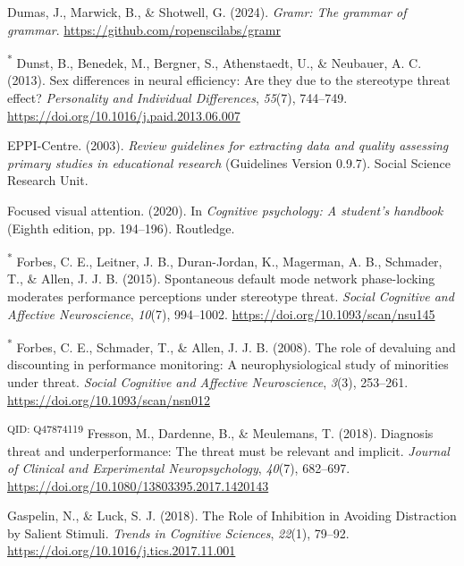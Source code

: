 \documentclass[
  stu, a4paper,floatsintext]{apa7}
\newlength{\cslhangindent}
\newenvironment{CSLReferences}[2] %
 {\begin{list}{}{%
  \setlength{\itemindent}{0pt}
  \setlength{\leftmargin}{0pt}
  \setlength{\parsep}{0pt}
  \ifodd #1
   \setlength{\leftmargin}{\cslhangindent}
   \setlength{\itemindent}{-1\cslhangindent}
  \fi
  \setlength{\itemsep}{#2\baselineskip}}}
 {\end{list}}
\begin{document}
\begin{CSLReferences}{1}{0}
Dumas, J., Marwick, B., \& Shotwell, G. (2024). \emph{Gramr: The grammar of grammar}. \url{https://github.com/ropenscilabs/gramr}

\textsuperscript{*} Dunst, B., Benedek, M., Bergner, S., Athenstaedt, U., \& Neubauer, A. C. (2013). Sex differences in neural efficiency: {Are} they due to the stereotype threat effect? \emph{Personality and Individual Differences}, \emph{55}(7), 744--749. \url{https://doi.org/10.1016/j.paid.2013.06.007}

EPPI-Centre. (2003). \emph{Review guidelines for extracting data and quality assessing primary studies in educational research} (Guidelines Version 0.9.7). Social Science Research Unit.

Focused visual attention. (2020). In \emph{Cognitive psychology: A student's handbook} (Eighth edition, pp. 194--196). Routledge.

\textsuperscript{*} Forbes, C. E., Leitner, J. B., Duran-Jordan, K., Magerman, A. B., Schmader, T., \& Allen, J. J. B. (2015). Spontaneous default mode network phase-locking moderates performance perceptions under stereotype threat. \emph{Social Cognitive and Affective Neuroscience}, \emph{10}(7), 994--1002. \url{https://doi.org/10.1093/scan/nsu145}

\textsuperscript{*} Forbes, C. E., Schmader, T., \& Allen, J. J. B. (2008). The role of devaluing and discounting in performance monitoring: A neurophysiological study of minorities under threat. \emph{Social Cognitive and Affective Neuroscience}, \emph{3}(3), 253--261. \url{https://doi.org/10.1093/scan/nsn012}

\textsuperscript{QID: Q47874119} Fresson, M., Dardenne, B., \& Meulemans, T. (2018). Diagnosis threat and underperformance: {The} threat must be relevant and implicit. \emph{Journal of Clinical and Experimental Neuropsychology}, \emph{40}(7), 682--697. \url{https://doi.org/10.1080/13803395.2017.1420143}

Gaspelin, N., \& Luck, S. J. (2018). The {Role} of {Inhibition} in {Avoiding Distraction} by {Salient Stimuli}. \emph{Trends in Cognitive Sciences}, \emph{22}(1), 79--92. \url{https://doi.org/10.1016/j.tics.2017.11.001}


\end{CSLReferences}
\end{document}
